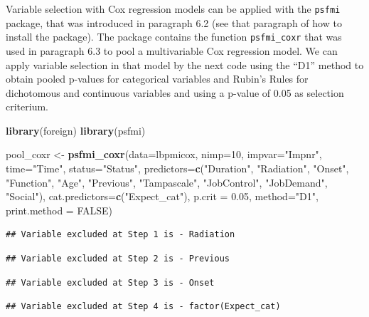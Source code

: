 \documentclass[
]{book}
\newenvironment{Shaded}{\begin{snugshade}}{\end{snugshade}}
\newcommand{\DataTypeTok}[1]{\textcolor[rgb]{0.13,0.29,0.53}{#1}}
\newcommand{\DecValTok}[1]{\textcolor[rgb]{0.00,0.00,0.81}{#1}}
\newcommand{\FloatTok}[1]{\textcolor[rgb]{0.00,0.00,0.81}{#1}}
\newcommand{\KeywordTok}[1]{\textcolor[rgb]{0.13,0.29,0.53}{\textbf{#1}}}
\newcommand{\NormalTok}[1]{#1}
\newcommand{\OtherTok}[1]{\textcolor[rgb]{0.56,0.35,0.01}{#1}}
\newcommand{\StringTok}[1]{\textcolor[rgb]{0.31,0.60,0.02}{#1}}
\begin{document}
Variable selection with Cox regression models can be applied with the \texttt{psfmi} package, that was introduced in paragraph 6.2 (see that paragraph of how to install the package). The package contains the function \texttt{psfmi\_coxr} that was used in paragraph 6.3 to pool a multivariable Cox regression model. We can apply variable selection in that model by the next code using the ``D1'' method to obtain pooled p-values for categorical variables and Rubin's Rules for dichotomous and continuous variables and using a p-value of 0.05 as selection criterium.

\begin{Shaded}
\begin{Highlighting}[]
\KeywordTok{library}\NormalTok{(foreign)}
\KeywordTok{library}\NormalTok{(psfmi)}

\NormalTok{pool_coxr <-}\StringTok{ }\KeywordTok{psfmi_coxr}\NormalTok{(}\DataTypeTok{data=}\NormalTok{lbpmicox, }\DataTypeTok{nimp=}\DecValTok{10}\NormalTok{, }\DataTypeTok{impvar=}\StringTok{"Impnr"}\NormalTok{, }\DataTypeTok{time=}\StringTok{"Time"}\NormalTok{, }\DataTypeTok{status=}\StringTok{"Status"}\NormalTok{,}
  \DataTypeTok{predictors=}\KeywordTok{c}\NormalTok{(}\StringTok{"Duration"}\NormalTok{, }\StringTok{"Radiation"}\NormalTok{, }\StringTok{"Onset"}\NormalTok{, }\StringTok{"Function"}\NormalTok{, }\StringTok{"Age"}\NormalTok{,}
  \StringTok{"Previous"}\NormalTok{, }\StringTok{"Tampascale"}\NormalTok{, }\StringTok{"JobControl"}\NormalTok{, }\StringTok{"JobDemand"}\NormalTok{, }\StringTok{"Social"}\NormalTok{), }
  \DataTypeTok{cat.predictors=}\KeywordTok{c}\NormalTok{(}\StringTok{"Expect_cat"}\NormalTok{), }\DataTypeTok{p.crit =} \FloatTok{0.05}\NormalTok{, }\DataTypeTok{method=}\StringTok{"D1"}\NormalTok{, }\DataTypeTok{print.method =} \OtherTok{FALSE}\NormalTok{)}
\end{Highlighting}
\end{Shaded}

\begin{verbatim}
## Variable excluded at Step 1 is - Radiation
\end{verbatim}

\begin{verbatim}
## Variable excluded at Step 2 is - Previous
\end{verbatim}

\begin{verbatim}
## Variable excluded at Step 3 is - Onset
\end{verbatim}

\begin{verbatim}
## Variable excluded at Step 4 is - factor(Expect_cat)
\end{verbatim}
\end{document}
